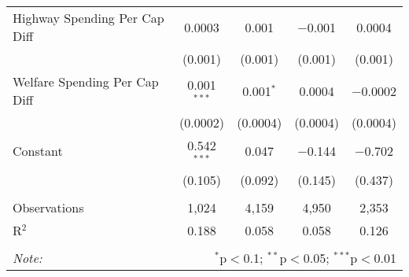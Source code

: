 \begin{table}[!htbp]
\begin{tabular}{@{\extracolsep{5pt}}lcccc}
  Highway Spending Per Cap Diff & 0.0003 & 0.001 & $-$0.001 & 0.0004 \\ 
  & (0.001) & (0.001) & (0.001) & (0.001) \\ 
  Welfare Spending Per Cap Diff & 0.001$^{***}$ & 0.001$^{*}$ & 0.0004 & $-$0.0002 \\ 
  & (0.0002) & (0.0004) & (0.0004) & (0.0004) \\ 
  Constant & 0.542$^{***}$ & 0.047 & $-$0.144 & $-$0.702 \\ 
  & (0.105) & (0.092) & (0.145) & (0.437) \\ 
 \hline \\[-1.8ex] 
Observations & 1,024 & 4,159 & 4,950 & 2,353 \\ 
R$^{2}$ & 0.188 & 0.058 & 0.058 & 0.126 \\ 
\hline 
\hline \\[-1.8ex] 
\textit{Note:}  & \multicolumn{4}{r}{$^{*}$p$<$0.1; $^{**}$p$<$0.05; $^{***}$p$<$0.01} \\ 
\end{tabular} 
\end{table} 
